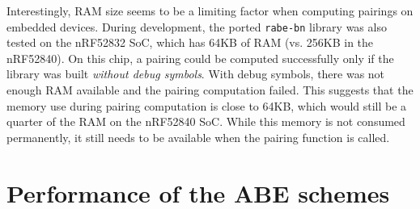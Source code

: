 

Interestingly, RAM size seems to be a limiting factor when computing pairings on embedded devices.
During development, the ported \texttt{rabe-bn} library was also tested on the nRF52832 SoC, which has 64KB of RAM (vs. 256KB in the nRF52840). 
On this chip, a pairing could be computed successfully only if the library was built \emph{without debug symbols}.
With debug symbols, there was not enough RAM available and the pairing computation failed.
This suggests that the memory use during pairing computation is close to 64KB, which would still be a quarter of the RAM on the nRF52840 SoC.
While this memory is not consumed permanently, it still needs to be available when the pairing function is called.

\section{Performance of the ABE schemes}


